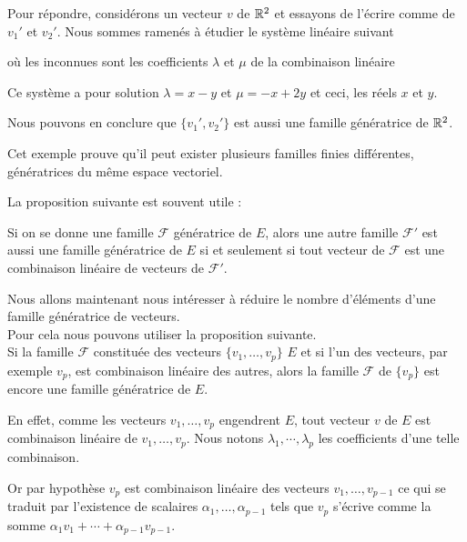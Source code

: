   \change
  Pour répondre, considérons un vecteur   $v$  de $\mathbb{R}^2$ et essayons de l'écrire comme  de $v_1'$ et $v_2'$. 
  Nous sommes ramenés à étudier le système linéaire suivant 
  
  \change
  o\`u les inconnues sont les coefficients $\lambda$ et $\mu$ de la combinaison linéaire
  
  \change
  Ce système  a pour solution
  $\lambda =x -y$ et $\mu =-x+2y$ 
et ceci,  les réels $x$ et $y$.

\change
Nous pouvons en conclure que $\{v_1', v_2'\}$ est aussi une famille génératrice de $\mathbb{R}^2$.
 
 
 \change
Cet exemple prouve qu'il peut exister plusieurs familles finies différentes, 
génératrices du même espace vectoriel.


\diapo
La proposition suivante est souvent utile :


Si on se donne une famille  $\mathcal{F}$  génératrice de $E$, alors une autre famille 
 $\mathcal{F}'$ est aussi une famille
génératrice de $E$ si et seulement si tout vecteur de $\mathcal{F}$ 
est une combinaison linéaire de vecteurs de $\mathcal{F}'$. 



\diapo
Nous allons maintenant nous intéresser à réduire 
le nombre d'éléments d'une famille génératrice de vecteurs. 
\\
Pour cela nous pouvons utiliser la proposition suivante.
\\
Si la famille $\mathcal{F} $ constituée des vecteurs   $\{v_1,\ldots,v_p\}$  $E$ et si l'un des vecteurs, 
par exemple $v_p$, est combinaison linéaire des autres, alors la famille 
$\mathcal{F}$  de $ \{v_p\}$
est encore une famille génératrice de $E$.

\change
En effet, comme les vecteurs  $v_1,\dots ,v_p$ engendrent $E$, tout vecteur 
 $v$ de $E$ est combinaison linéaire de $v_1,\dots ,v_p$. Nous notons 
 $\lambda_1, \cdots, \lambda_p$ les coefficients d'une telle combinaison.
 
 \change
Or par  hypothèse $v_p$ est combinaison linéaire des vecteurs  
$v_1,\dots ,v_{p-1}$ ce qui se traduit par l'existence de scalaires 
$\alpha_1, \ldots, \alpha_{p-1}$ tels que
$v_p $ s'écrive comme la somme $\alpha_1 v_1 + \cdots + \alpha_{p-1}v_{p-1}.$

